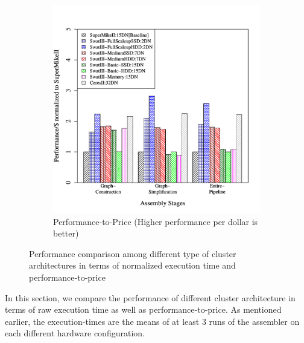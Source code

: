 \documentclass[conference]{IEEEtran}
\begin{document}
\begin{figure}[htb]
\begin{subfigure}[b]{0.5\textwidth}
                \includegraphics[width=\textwidth, height=.27\textheight]{Figure/PerormanceData/Plots/PerfPerDollarDiffArch.pdf}
                \caption{Performance-to-Price (Higher performance per dollar is better)}
                \label{fig:DifferentArchitecturesPerfPerDollar}
        \end{subfigure}
        \caption{Performance comparison among different type of cluster architectures in terms of normalized execution time and performance-to-price}
  \label{fig:DifferentArchitectures}
  \vspace{-1.5em}
\end{figure}
In this section, we compare the performance of different cluster architecture in terms of raw execution time as well as performance-to-price.
As mentioned earlier, the execution-times are the means of at least 3 runs of the assembler on each different hardware configuration.
\end{document}
